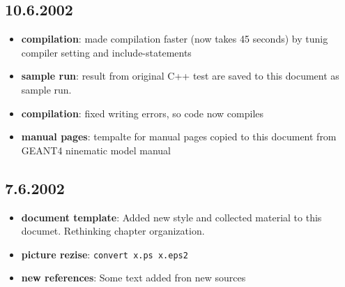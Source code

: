 \begin{appendix}
\begin{itemize}
\end{itemize}

\subsection{10.6.2002}
\begin{itemize}
\item {\bf compilation}: made compilation faster (now takes 45 seconds) by tunig compiler setting and include-statements
\item {\bf sample run}: result from original C++ test are saved to this document as sample run.
\item {\bf compilation}: fixed writing errors, so code now compiles
\item {\bf manual pages}: tempalte for manual pages copied to this document from GEANT4 ninematic model manual 
\end{itemize}

\subsection{7.6.2002}
\begin{itemize}
\item {\bf document template}: Added new style and collected material to this documet. Rethinking chapter organization.
\item {\bf picture rezise}: {\tt convert x.ps x.eps2}
\item {\bf new references}: Some text added fron new sources
\end{itemize}

\end{appendix}
%





